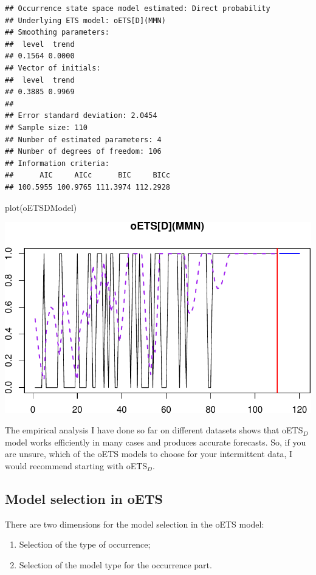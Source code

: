 \documentclass[
]{book}
\newenvironment{Shaded}{\begin{snugshade}}{\end{snugshade}}
\newcommand{\FunctionTok}[1]{\textcolor[rgb]{0.00,0.00,0.00}{#1}}
\newcommand{\NormalTok}[1]{#1}
\providecommand{\tightlist}{%
  \setlength{\itemsep}{0pt}\setlength{\parskip}{0pt}}
\theoremstyle{definition}
\theoremstyle{definition}
\theoremstyle{definition}
\theoremstyle{definition}
\theoremstyle{remark}
\begin{document}
\begin{verbatim}
## Occurrence state space model estimated: Direct probability
## Underlying ETS model: oETS[D](MMN)
## Smoothing parameters:
##  level  trend 
## 0.1564 0.0000 
## Vector of initials:
##  level  trend 
## 0.3885 0.9969 
## 
## Error standard deviation: 2.0454
## Sample size: 110
## Number of estimated parameters: 4
## Number of degrees of freedom: 106
## Information criteria: 
##      AIC     AICc      BIC     BICc 
## 100.5955 100.9765 111.3974 112.2928
\end{verbatim}

\begin{Shaded}
\begin{Highlighting}[]
\FunctionTok{plot}\NormalTok{(oETSDModel)}
\end{Highlighting}
\end{Shaded}

\includegraphics{adam_files/figure-latex/oETSDExample1-1.pdf}

The empirical analysis I have done so far on different datasets shows that oETS\(_D\) model works efficiently in many cases and produces accurate forecasts. So, if you are unsure, which of the oETS models to choose for your intermittent data, I would recommend starting with oETS\(_D\).

\hypertarget{oETSModelSelection}{%
\subsection{Model selection in oETS}\label{oETSModelSelection}}

There are two dimensions for the model selection in the oETS model:

\begin{enumerate}
\def\labelenumi{\arabic{enumi}.}
\tightlist
\item
  Selection of the type of occurrence;
\item
  Selection of the model type for the occurrence part.
\end{enumerate}
\end{document}
